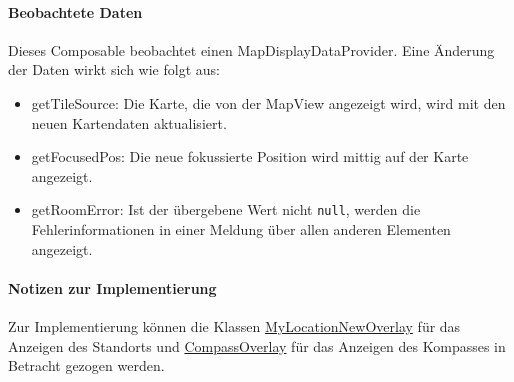 \paragraph*{Beobachtete Daten}
Dieses Composable beobachtet einen MapDisplayDataProvider. 
Eine Änderung der Daten wirkt sich wie folgt aus:
\begin{itemize}
    \item getTileSource: Die Karte, die von der MapView angezeigt wird, wird mit den neuen 
    Kartendaten aktualisiert.
    \item getFocusedPos: Die neue fokussierte Position wird mittig auf der Karte angezeigt.
    \item getRoomError: Ist der übergebene Wert nicht \texttt{null}, werden die Fehlerinformationen 
    in einer Meldung über allen anderen Elementen angezeigt.
\end{itemize}

\paragraph*{Notizen zur Implementierung}
Zur Implementierung können die Klassen \href{https://osmdroid.github.io/osmdroid/javadocs/osmdroid-android/debug/org/osmdroid/views/overlay/mylocation/MyLocationNewOverlay.html}
{MyLocationNewOverlay} für das Anzeigen des Standorts und \href{https://osmdroid.github.io/osmdroid/javadocs/osmdroid-android/debug/org/osmdroid/views/overlay/compass/CompassOverlay.html}
{CompassOverlay} für das Anzeigen des Kompasses in Betracht gezogen werden.
